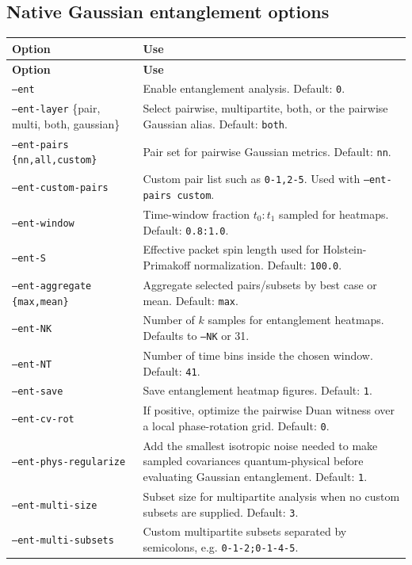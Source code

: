 \documentclass[11pt]{article}
\begin{document}
\subsection{Native Gaussian entanglement options}
\begin{longtable}{L{0.31\textwidth}L{0.61\textwidth}}
\toprule
\textbf{Option} & \textbf{Use} \\
\midrule
\endfirsthead
\toprule
\textbf{Option} & \textbf{Use} \\
\midrule
\endhead
\texttt{--ent} & Enable entanglement analysis. Default: \texttt{0}. \\
\texttt{--ent-layer} \{pair, multi, both, gaussian\} & Select pairwise, multipartite, both, or the pairwise Gaussian alias. Default: \texttt{both}. \\
\texttt{--ent-pairs \{nn,all,custom\}} & Pair set for pairwise Gaussian metrics. Default: \texttt{nn}. \\
\texttt{--ent-custom-pairs} & Custom pair list such as \texttt{0-1,2-5}. Used with \texttt{--ent-pairs custom}. \\
\texttt{--ent-window} & Time-window fraction \(t_0:t_1\) sampled for heatmaps. Default: \texttt{0.8:1.0}. \\
\texttt{--ent-S} & Effective packet spin length used for Holstein-Primakoff normalization. Default: \texttt{100.0}. \\
\texttt{--ent-aggregate \{max,mean\}} & Aggregate selected pairs/subsets by best case or mean. Default: \texttt{max}. \\
\texttt{--ent-NK} & Number of \(k\) samples for entanglement heatmaps. Defaults to \texttt{--NK} or 31. \\
\texttt{--ent-NT} & Number of time bins inside the chosen window. Default: \texttt{41}. \\
\texttt{--ent-save} & Save entanglement heatmap figures. Default: \texttt{1}. \\
\texttt{--ent-cv-rot} & If positive, optimize the pairwise Duan witness over a local phase-rotation grid. Default: \texttt{0}. \\
\texttt{--ent-phys-regularize} & Add the smallest isotropic noise needed to make sampled covariances quantum-physical before evaluating Gaussian entanglement. Default: \texttt{1}. \\
\texttt{--ent-multi-size} & Subset size for multipartite analysis when no custom subsets are supplied. Default: \texttt{3}. \\
\texttt{--ent-multi-subsets} & Custom multipartite subsets separated by semicolons, e.g. \texttt{0-1-2;0-1-4-5}. \\

\end{longtable}
\end{document}
